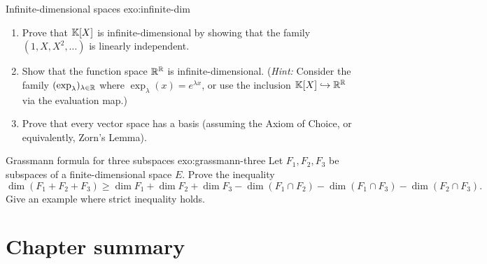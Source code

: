 \begin{exercise}{Infinite-dimensional spaces \challenging}{exo:infinite-dim}
\begin{enumerate}[label=(\alph*)]
  \item Prove that ${\mathbb{K}}[X]$ is infinite-dimensional by showing that the
    family $(1,X,X^2,\ldots)$ is linearly independent.
  \item Show that the function space ${\mathbb{R}}^{\mathbb{R}}$ is infinite-dimensional.
    (\emph{Hint:} Consider the family $(\exp_\lambda)_{\lambda\in{\mathbb{R}}}$
    where $\exp_\lambda(x)=e^{\lambda x}$, or use the inclusion
    ${\mathbb{K}}[X]\hookrightarrow{\mathbb{R}}^{\mathbb{R}}$ via the evaluation map.)
  \item Prove that every vector space has a basis (assuming the Axiom of
    Choice, or equivalently, Zorn's Lemma).
\end{enumerate}
\end{exercise}

\begin{exercise}{Grassmann formula for three subspaces \challenging}{exo:grassmann-three}
Let $F_1,F_2,F_3$ be subspaces of a finite-dimensional space $E$. Prove
the inequality
\[
  \dim(F_1+F_2+F_3) \geq \dim F_1+\dim F_2+\dim F_3
  -\dim(F_1\cap F_2)-\dim(F_1\cap F_3)-\dim(F_2\cap F_3).
\]
Give an example where strict inequality holds.
\end{exercise}


\section*{Chapter summary}\label{sec:ch1-summary}

